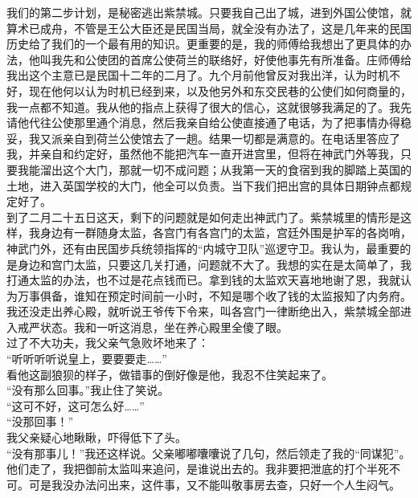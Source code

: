 我们的第二步计划，是秘密逃出紫禁城。只要我自己出了城，进到外国公使馆，就算术已成舟，不管是王公大臣还是民国当局，就全没有办法了，这是几年来的民国历史给了我们的一个最有用的知识。更重要的是，我的师傅给我想出了更具体的办法，他叫我先和公使团的首席公使荷兰的联络好，好使他事先有所准备。庄师傅给我出这个主意已是民国十二年的二月了。九个月前他曾反对我出洋，认为时机不好，现在他何以认为时机已经到来，以及他另外和东交民巷的公使们如何商量的，我一点都不知道。我从他的指点上获得了很大的信心，这就很够我满足的了。我先请他代往公使那里通个消息，然后我亲自给公使直接通了电话，为了把事情办得稳妥，我又派亲自到荷兰公使馆去了一趟。结果一切都是满意的。在电话里答应了我，并亲自和约定好，虽然他不能把汽车一直开进宫里，但将在神武门外等我，只要我能溜出这个大门，那就一切不成问题；从我第一天的食宿到我的脚踏上英国的土地，进入英国学校的大门，他全可以负责。当下我们把出宫的具体日期钟点都规定好了。\\

到了二月二十五日这天，剩下的问题就是如何走出神武门了。紫禁城里的情形是这样，我身边有一群随身太监，各宫门有各宫门的太监，宫廷外围是护军的各岗哨，神武门外，还有由民国步兵统领指挥的“内城守卫队”巡逻守卫。我认为，最重要的是身边和宫门太监，只要这几关打通，问题就不大了。我想的实在是太简单了，我打通太监的办法，也不过是花点钱而已。拿到钱的太监欢天喜地地谢了恩，我就认为万事俱备，谁知在预定时间前一小时，不知是哪个收了钱的太监报知了内务府。我还没走出养心殿，就听说王爷传下令来，叫各宫门一律断绝出入，紫禁城全部进入戒严状态。我和一听这消息，坐在养心殿里全傻了眼。\\

过了不大功夫，我父亲气急败坏地来了：\\

“听听听听说皇上，要要要走……”\\

看他这副狼狈的样子，做错事的倒好像是他，我忍不住笑起来了。\\

“没有那么回事。”我止住了笑说。\\

“这可不好，这可怎么好……”\\

“没那回事！”\\

我父亲疑心地瞅瞅，吓得低下了头。\\

“没有那事儿！”我还这样说。父亲嘟嘟囔囔说了几句，然后领走了我的“同谋犯”。他们走了，我把御前太监叫来追问，是谁说出去的。我非要把泄底的打个半死不可。可是我没办法问出来，这件事，又不能叫敬事房去查，只好一个人生闷气。\\

